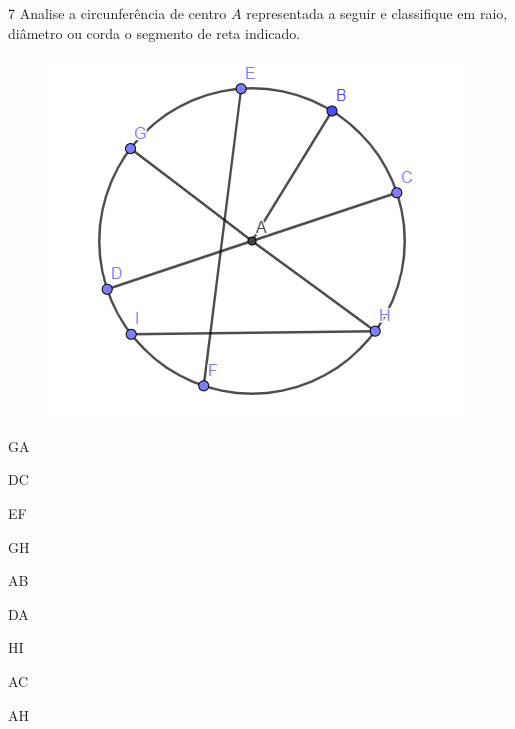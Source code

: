 




\num{7} Analise a circunferência de centro $A$ representada a seguir e
classifique em raio, diâmetro ou corda o segmento de reta indicado.

\begin{figure}[H]
\centering\includegraphics[width=\textwidth]{./imgSAEB_8_MAT/media/image12.png}
\end{figure}

\begin{escolha}
\item GA

\item DC

\item EF

\item GH

\item AB

\item DA

\item HI

\item AC

\item AH

\end{escolha}


